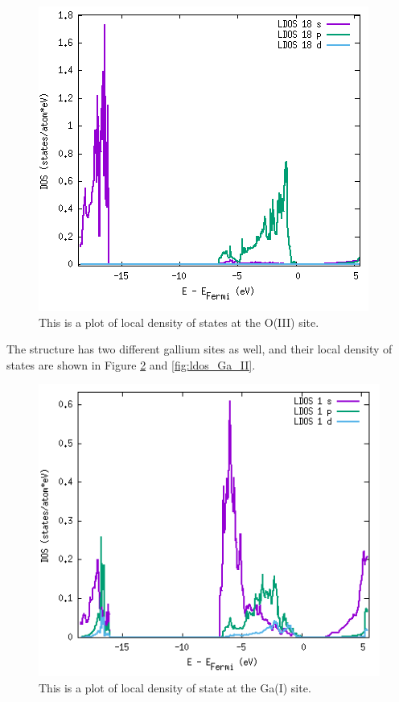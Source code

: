 \begin{figure}[H]
\includegraphics[width=\linewidth]{../fig/dosplot/ldos_O_III_primitive}\caption{This is a plot of local density of states at the O(III) site.}\label{fig:ldos_O_III}
\end{figure}

The structure has two different gallium sites as well, and their local density of states are shown in Figure \ref{fig:ldos_Ga_I} and \ref{fig:ldos_Ga_II}.

\begin{figure}[H]
\includegraphics[width=\linewidth]{../fig/dosplot/ldos_Ga_I_primitive}\caption{This is a plot of local density of state at the Ga(I) site.}\label{fig:ldos_Ga_I}
\end{figure}

